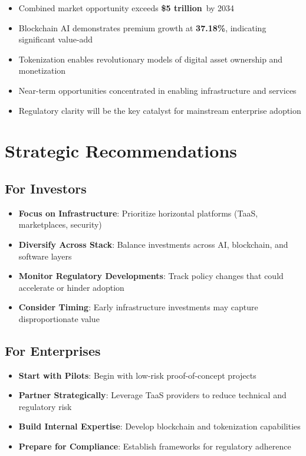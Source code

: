 \documentclass[11pt,a4paper]{report}
\newcommand{\marketvalue}[2]{\textcolor{trust}{\textbf{\$#1}}\,\textcolor{darkgray}{#2}}
\newcommand{\cagr}[1]{\textcolor{sun}{\textbf{#1\%}}}
\begin{document}
\begin{keypoint}
\begin{itemize}
    \item Combined market opportunity exceeds \marketvalue{5 trillion}{} by 2034
    \item Blockchain AI demonstrates premium growth at \cagr{37.18}, indicating significant value-add
    \item Tokenization enables revolutionary models of digital asset ownership and monetization
    \item Near-term opportunities concentrated in enabling infrastructure and services
    \item Regulatory clarity will be the key catalyst for mainstream enterprise adoption
\end{itemize}
\end{keypoint}

\section{Strategic Recommendations}

\subsection{For Investors}
\begin{itemize}
    \item \textbf{Focus on Infrastructure}: Prioritize horizontal platforms (TaaS, marketplaces, security)
    \item \textbf{Diversify Across Stack}: Balance investments across AI, blockchain, and software layers
    \item \textbf{Monitor Regulatory Developments}: Track policy changes that could accelerate or hinder adoption
    \item \textbf{Consider Timing}: Early infrastructure investments may capture disproportionate value
\end{itemize}

\subsection{For Enterprises}
\begin{itemize}
    \item \textbf{Start with Pilots}: Begin with low-risk proof-of-concept projects
    \item \textbf{Partner Strategically}: Leverage TaaS providers to reduce technical and regulatory risk
    \item \textbf{Build Internal Expertise}: Develop blockchain and tokenization capabilities
    \item \textbf{Prepare for Compliance}: Establish frameworks for regulatory adherence
\end{itemize}
\end{document}
